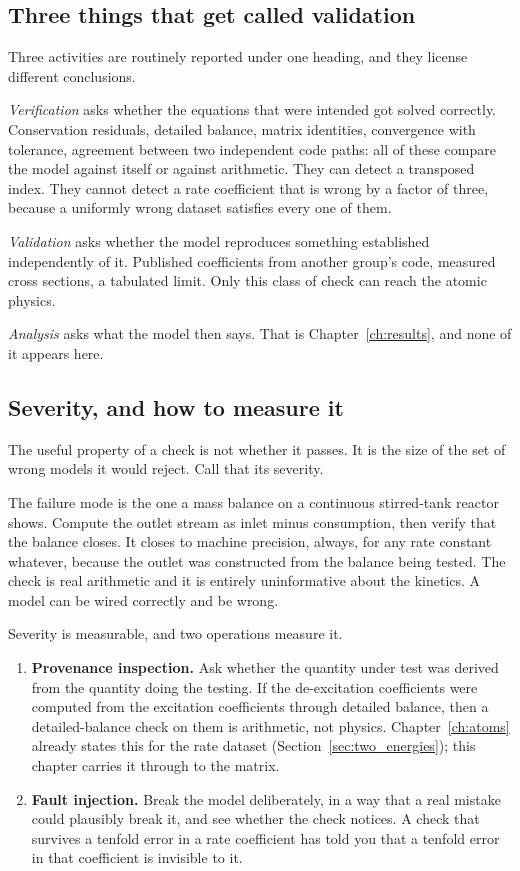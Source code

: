 \subsection{Three things that get called validation}

Three activities are routinely reported under one heading, and they license
different conclusions.

\emph{Verification} asks whether the equations that were intended got solved
correctly. Conservation residuals, detailed balance, matrix identities,
convergence with tolerance, agreement between two independent code paths: all
of these compare the model against itself or against arithmetic. They can
detect a transposed index. They cannot detect a rate coefficient that is wrong
by a factor of three, because a uniformly wrong dataset satisfies every one of
them.

\emph{Validation} asks whether the model reproduces something established
independently of it. Published coefficients from another group's code, measured
cross sections, a tabulated limit. Only this class of check can reach the
atomic physics.

\emph{Analysis} asks what the model then says. That is Chapter~\ref{ch:results},
and none of it appears here.

\subsection{Severity, and how to measure it}

The useful property of a check is not whether it passes. It is the size of the
set of wrong models it would reject. Call that its severity.

The failure mode is the one a mass balance on a continuous stirred-tank
reactor shows. Compute the outlet stream as inlet minus consumption, then
verify that the balance closes. It closes to machine
precision, always, for any rate constant whatever, because the outlet was
constructed from the balance being tested. The check is real arithmetic and it
is entirely uninformative about the kinetics. A model can be wired correctly
and be wrong.

Severity is measurable, and two operations measure it.

\begin{enumerate}
\item \textbf{Provenance inspection.} Ask whether the quantity under test was
derived from the quantity doing the testing. If the de-excitation coefficients
were computed from the excitation coefficients through detailed balance, then a
detailed-balance check on them is arithmetic, not physics. Chapter~\ref{ch:atoms}
already states this for the rate dataset (Section~\ref{sec:two_energies}); this
chapter carries it through to the matrix.

\item \textbf{Fault injection.} Break the model deliberately, in a way that a
real mistake could plausibly break it, and see whether the check notices. A
check that survives a tenfold error in a rate coefficient has told you that a
tenfold error in that coefficient is invisible to it.
\end{enumerate}

